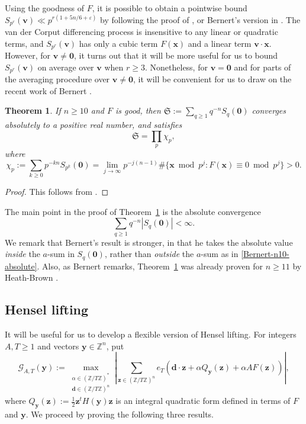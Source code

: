 \documentclass[a4paper,11pt, twoside,reqno]{amsart}
\theoremstyle{plain}
\newtheorem{thm}{Theorem}[section]
\theoremstyle{definition}
\theoremstyle{remark}
\newcommand{\bfv}{\bm{v}}
\newcommand{\bfx}{\bm{x}}
\newcommand{\bfy}{\bm{y}}
\newcommand{\bfz}{\bm{z}}
\newcommand{\bfd}{\bm{d}}
\newcommand{\ZZ}{\mathbb{Z}}
\newcommand{\ve}{\varepsilon}
\renewcommand{\ge}{\geqslant}
\numberwithin{equation}{section}
\begin{document}
Using the goodness of $F$,
it is possible to obtain a pointwise bound
$S_{p^r}(\bfv)\ll p^{r(1+5n/6+\ve)}$
by following the proof of \cite[Eq.~(7.1)]{HB07},
or Bernert's version in \cite[\S3]{Ber25}.
The van der Corput differencing process is insensitive to any linear or quadratic terms, and $S_{p^r}(\bfv)$ has only
a cubic term $F(\bfx)$
and a linear term $\bfv\cdot \bfx$.
However, for $\bfv\ne \bm0$,
it turns out that it will be more useful for us to bound
$S_{p^r}(\bfv)$ on average over $\bfv$ when $r\ge 3$.
Nonetheless, for $\bfv=\bm0$ and for parts of the averaging procedure over $\bfv\ne \bm0$,
it will be convenient for us to draw on the recent work of
Bernert \cite{Ber25}.

\begin{thm}
\label{Bernert-n10-sing-series}
If $n\ge 10$ and $F$ is good,
then $\mathfrak S := \sum_{q\ge 1} q^{-n} S_q(\bm0)$
converges absolutely to a positive real number,
and satisfies
\[
\mathfrak S=\prod_p\chi_p,
\]
where
\[
\chi_p
:=\sum_{k\ge0}p^{-kn}S_{p^k}(\bm0)
=\lim_{j\to\infty}p^{-j(n-1)}
\#\{\bfx\bmod p^j:F(\bfx)\equiv0\bmod p^j\}
>0.
\]
\end{thm}

\begin{proof}
This follows from \cite[\S2, Theorem~1]{Ber25}.
\end{proof}

The main point in the proof of Theorem~\ref{Bernert-n10-sing-series} is the absolute convergence
\begin{equation}
\label{Bernert-n10-absolute}
\sum_{q\ge 1} q^{-n} |S_q(\bm0)| < \infty.
\end{equation}
We remark that Bernert's result is stronger,
in that he takes the absolute value \emph{inside} the $a$-sum in $S_q(\bm0)$,
rather than \emph{outside} the $a$-sum as in \eqref{Bernert-n10-absolute}.
Also,
as Bernert remarks, Theorem~\ref{Bernert-n10-sing-series} was already proven for $n\ge 11$
by Heath-Brown \cite{HB07}.



\subsection{Hensel lifting}

It will be useful for us to develop a flexible version of Hensel lifting.
For integers $A,T\ge 1$
and vectors $\bfy\in \ZZ^n$, put
\begin{equation}
\label{eq:GAT-max-sum}
\mathcal G_{A,T}(\bfy)
:= \max_{\substack{\alpha\in (\ZZ/T\ZZ)^\ast\\
\bfd\in (\ZZ/T\ZZ)^n}}
\left|
\sum_{\bfz\in (\ZZ/T\ZZ)^n}
e_T(\bfd\cdot\bfz+\alpha Q_{\bfy}(\bfz)+\alpha A F(\bfz))
\right|,
\end{equation}
where $Q_{\bfy}(\bfz):=\frac12\bfz^tH(\bfy)\bfz$
is an integral quadratic form defined in terms of $F$ and $\bfy$.
We proceed by proving the following three results. 
\end{document}
